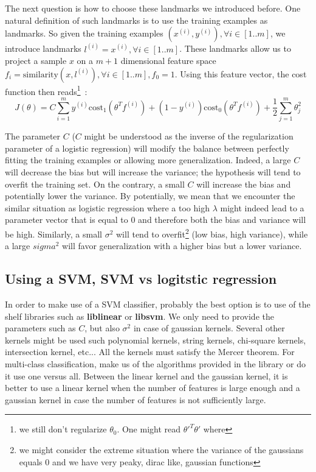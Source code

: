 \documentclass[10pt,a4paper]{article}
\begin{document}
The next question is how to choose these landmarks we introduced
before. One natural definition of such landmarks is to use the
training examples as landmarks. So given the training examples
$(x^{(i)}, y^{(i)}), \forall i\in[1..m]$, we introduce landmarks $l^{(i)} =
x^{(i)}, \forall i \in [1..m]$. These landmarks allow us to project a
sample $x$ on a $m+1$ dimensional feature space $f_i =
\mathrm{similarity}(x, l^{(i)}), \forall i \in [1..m], f_0 = 1$. Using
this feature vector, the cost function then reads\footnote{we still
  don't regularize $\theta_0$. One might read $\theta'^T\theta'$ where }~:
\begin{equation}
J(\theta) = C \sum_{i=1}^m y^{(i)} \mathrm{cost}_1 (\theta^T f^{(i)})
+ (1-y^{(i)}) \mathrm{cost}_0(\theta^T f^{(i)}) + \frac{1}{2}
\sum_{j=1}^m \theta_j^2
\end{equation}

The parameter $C$ ($C$ might be understood as the inverse of the regularization parameter of a logistic regression) will modify the balance between perfectly fitting the training examples or allowing more generalization. Indeed, a large $C$ will decrease the bias but will increase the variance; the hypothesis will tend to overfit the training set. On the contrary, a small $C$ will increase the bias and potentially lower the variance. By potentially, we mean that we encounter the similar situation as logistic regression where a too high $\lambda$ might indeed lead to a parameter vector that is equal to $0$ and therefore both the bias and variance will be high. Similarly, a small $\sigma^2$ will tend to overfit\footnote{we might consider the extreme situation where the variance of the gaussians equals $0$ and we have very peaky, dirac like, gaussian functions} (low bias, high variance), while a large $sigma^2$ will favor generalization with a higher bias but a lower variance.

\subsection{Using a SVM, SVM vs logitstic regression}

In order to make use of a SVM classifier, probably the best option is to use of the shelf libraries such as \textbf{liblinear} or \textbf{libsvm}. We only need to provide the parameters such as $C$, but also $\sigma^2$ in case of gaussian kernels. Several other kernels might be used such polynomial kernels, string kernels, chi-square kernels, intersection kernel, etc... All the kernels must satisfy the Mercer theorem. For multi-class classification, make us of the algorithms provided in the library or do it use one versus all. Between the linear kernel and the gaussian kernel, it is better to use a linear kernel when the number of features is large enough and a gaussian kernel in case the number of features is not sufficiently large.\\
\end{document}
